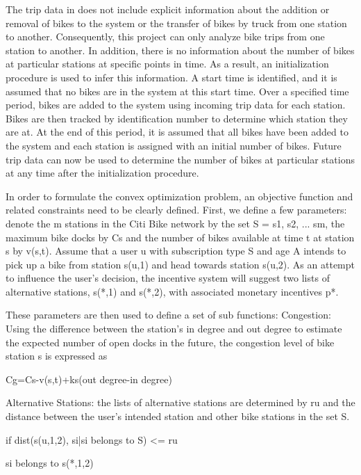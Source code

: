 \documentclass[times, 10pt,twocolumn]{article}
\begin{document}
The trip data in \cite{dataset} does not include explicit information about the addition or removal of bikes to the system or the transfer of bikes by truck from one station to another. Consequently, this project can only analyze bike trips from one station to another. In addition, there is no information about the number of bikes at particular stations at specific points in time. As a result, an initialization procedure is used to infer this information. A start time is identified, and it is assumed that no bikes are in the system at this start time. Over a specified time period, bikes are added to the system using incoming trip data for each station. Bikes are then tracked by identification number to determine which station they are at. At the end of this period, it is assumed that all bikes have been added to the system and each station is assigned with an initial number of bikes. Future trip data can now be used to determine the number of bikes at particular stations at any time after the initialization procedure.

In order to formulate the convex optimization problem, an objective function and related constraints need to be clearly defined. First, we define a few parameters: denote the m stations in the Citi Bike network by the set S = {s1, s2, ... sm}, the maximum bike docks by Cs and the number of bikes available at time t at station s by v(s,t). Assume that a user u with subscription type S and age A intends to pick up a bike from station s(u,1) and head towards station s(u,2). As an attempt to influence the user's decision, the incentive system will suggest two lists of alternative stations, s(*,1) and s(*,2), with associated monetary incentives p*. %

These parameters are then used to define a set of sub functions:
Congestion: Using the difference between the station's in degree and out degree to estimate the expected number of open docks in the future, the congestion level of bike station s is expressed as 
\centerline{Cg=Cs-v(s,t)+ks(out degree-in degree)}

Alternative Stations: the lists of alternative stations are determined by ru and the distance between the user's intended station and other bike stations in the set S.
\centerline{if dist(s(u,1,2), si|si belongs to S) <= ru}
\centerline{si belongs to s(*,1,2)}
\end{document}
